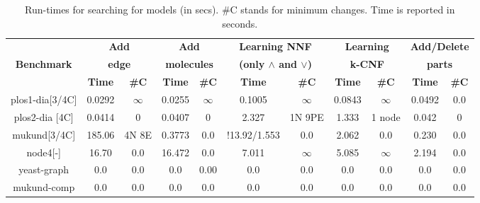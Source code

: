 \begin{table}[t]
  \centering
  \begin{tabular}[t]{|c@{}|@{}c@{}|@{}c@{}|@{}c@{}|@{}c@{}|@{}c@{}|@{}c@{}|@{}c@{}|@{}c@{}|@{}c@{}|@{}c@{}|}\hline
    {\multirow{2}{*} \textbf{}}  & \multicolumn{2}{c|}{\textbf{Add}} & \multicolumn{2}{c|}{\textbf{Add}} & \multicolumn{2}{c|}{\textbf{Learning NNF}}  &  \multicolumn{2}{c|}{\textbf{Learning}} &  \multicolumn{2}{c|}{\textbf{Add/Delete}} \\
    {\multirow{2}{*} \textbf{Benchmark}}  & \multicolumn{2}{c|}{\textbf{edge}} & \multicolumn{2}{c|}{\textbf{molecules}} & \multicolumn{2}{c|}{\textbf{(only $\land$ and $\lor$)}}  &  \multicolumn{2}{c|}{\textbf{k-CNF}} &  \multicolumn{2}{c|}{\textbf{parts}} \\
    \cline{2-11}
    {} & {\textbf{Time}} & {\textbf{\#C}} & {\textbf{Time}} & {\textbf{\#C}} & {\textbf{Time}} & {\textbf{\#C}} & {\textbf{Time}} & {\textbf{\#C}} & {\textbf{Time}} & {\textbf{\#C}} \\
    \hline
    
    plos1-dia[3/4C]& 0.0292&$\infty$& 0.0255 &$\infty$& 0.1005      & $\infty$ & 0.0843&$\infty$& 0.0492 & 0.0\\\hline
    plos2-dia [4C] & 0.0414& 0      & 0.0407 & 0      & 2.327       & 1N 9PE   & 1.333 & 1 node & 0.042  & 0 \\\hline
    mukund[3/4C]  & 185.06 & 4N 8E  & 0.3773 & 0.0    & !13.92/1.553& 0.0      & 2.062 & 0.0    & 0.230  & 0.0 \\\hline
    node4[-]      & 16.70  & 0.0    & 16.472 & 0.0    & 7.011       & $\infty$ & 5.085 &$\infty$& 2.194  & 0.0\\\hline
    yeast-graph   & 0.0    & 0.0    & 0.0    & 0.00   & 0.0         & 0.0      & 0.0   & 0.0    & 0.0    & 0.0 \\\hline
    mukund-comp   & 0.0    & 0.0    & 0.0    & 0.0    & 0.0         & 0.0      & 0.0   & 0.0    & 0.0    & 0.0\\\hline
  \end{tabular}
  \caption{Run-times for searching for models (in secs). \#C  stands for minimum changes.
  Time is reported in seconds.}
  \label{tab:qf-graph}
\end{table}

